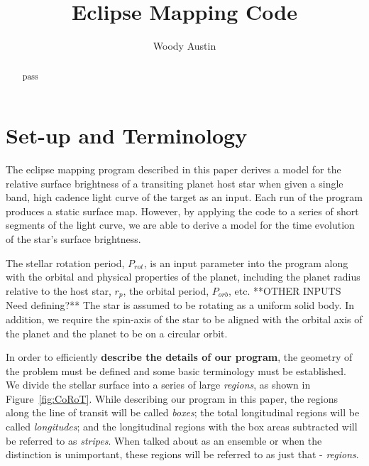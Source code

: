 \documentclass[iop]{emulateapj}
\begin{document}
\title{Eclipse Mapping Code}
\author{Woody Austin}

\begin{abstract}
pass
\end{abstract}
\maketitle


\section{Set-up and Terminology \label{terminology}}
The eclipse mapping program described in this paper derives a model for the relative surface
brightness of a transiting planet host star when given a single band, high cadence light curve
of the target as an input.  Each run of the program produces a static surface map.
However, by applying the code to a series of short segments of the 
light curve, we are able to derive a model for the time evolution of the star's surface brightness.  

The stellar rotation period, $P_{rot}$, is an input parameter into the program 
along with the orbital and physical properties of the planet, including the
planet radius relative to the host star, $r_{p}$, the orbital period, $P_{orb}$, etc.   **OTHER INPUTS Need defining?**
The star is assumed to be rotating as a uniform solid body.  In addition, we require the spin-axis of the star   
to be aligned with the orbital axis of the planet and the planet to be on a circular orbit.  

In order to efficiently {\bf describe the details of our program}, the geometry
of the problem must be defined and some basic terminology must be established.
We divide the stellar surface into a series of large {\it regions}, as shown in Figure~\ref{fig:CoRoT}.  
While describing our program in this paper, the regions along the line of transit will be called {\it boxes}; 
the total longitudinal regions will be called {\it longitudes};
and the longitudinal regions with the box areas subtracted will be referred to as {\it stripes}.
When talked about as an ensemble or when the distinction is unimportant, these regions will be referred to as just that - {\it regions}. 
\end{document}

